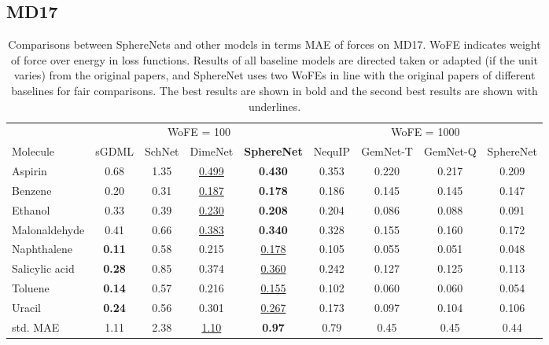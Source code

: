 \documentclass{article}
\begin{document}
\subsection{MD17}

\begin{table}[t]
\centering 
\caption{Comparisons between SphereNets and other models
    in terms
    MAE of forces on MD17. WoFE indicates weight of force over energy in loss functions.
    Results of all baseline models are directed taken or adapted (if the unit varies) from the original papers,
    and SphereNet uses two WoFEs in line with the original papers of different baselines for fair comparisons.
    The best results are shown in bold and the
    second best results are shown with underlines.
}\label{tb:md17}
{\begin{tabular}{l cccc | cccc  }
            \bottomrule
            &\multicolumn{4}{c|}{WoFE = 100} & \multicolumn{4}{c}{WoFE = 1000}  \\
            \cmidrule(l{4pt}r{4pt}){2-5}
            \cmidrule(l{4pt}r{4pt}){6-9}
Molecule &        sGDML &                SchNet  & DimeNet & \textbf{SphereNet} &NequIP& GemNet-T & GemNet-Q & SphereNet \\
\midrule
Aspirin & 0.68& 1.35& \underline{0.499} &\textbf{0.430} & 0.353  &0.220 & 0.217 & 0.209\\
Benzene  & 0.20& 0.31& \underline{0.187} &\textbf{0.178} & 0.186   &0.145 & 0.145 & 0.147\\
Ethanol & 0.33& 0.39& \underline{0.230} &\textbf{0.208} &  0.204  &0.086 & 0.088 & 0.091\\
Malonaldehyde  & 0.41& 0.66& \underline{0.383} &\textbf{0.340} & 0.328  &0.155 & 0.160 & 0.172\\
Naphthalene & \textbf{0.11}& 0.58& 0.215 &\underline{0.178}&  0.105 &0.055 & 0.051 & 0.048\\
Salicylic acid & \textbf{0.28}& 0.85& 0.374 &\underline{0.360} & 0.242  &0.127 & 0.125 & 0.113\\
Toluene  & \textbf{0.14}& 0.57& 0.216 &\underline{0.155} &  0.102  &0.060 & 0.060 &0.054\\
Uracil & \textbf{0.24}& 0.56& 0.301 &\underline{0.267} &  0.173  &0.097 & 0.104& 0.106\\
\hline
std. MAE & 1.11& 2.38& \underline{1.10} &\textbf{0.97} &  0.79 &0.45& 0.45 & 0.44\\
\bottomrule
\end{tabular}}
\end{table}
\setlength{\tabcolsep}{1.4pt}
\end{document}
